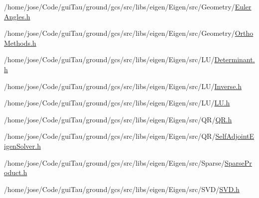 \begin{DoxyCompactItemize}
/home/jose/\-Code/gui\-Tau/ground/gcs/src/libs/eigen/\-Eigen/src/\-Geometry/\hyperlink{_euler_angles_8h}{Euler\-Angles.\-h}\item 
/home/jose/\-Code/gui\-Tau/ground/gcs/src/libs/eigen/\-Eigen/src/\-Geometry/\hyperlink{_ortho_methods_8h}{Ortho\-Methods.\-h}\item 
/home/jose/\-Code/gui\-Tau/ground/gcs/src/libs/eigen/\-Eigen/src/\-L\-U/\hyperlink{_determinant_8h}{Determinant.\-h}\item 
/home/jose/\-Code/gui\-Tau/ground/gcs/src/libs/eigen/\-Eigen/src/\-L\-U/\hyperlink{_inverse_8h}{Inverse.\-h}\item 
/home/jose/\-Code/gui\-Tau/ground/gcs/src/libs/eigen/\-Eigen/src/\-L\-U/\hyperlink{_l_u_8h}{L\-U.\-h}\item 
/home/jose/\-Code/gui\-Tau/ground/gcs/src/libs/eigen/\-Eigen/src/\-Q\-R/\hyperlink{_q_r_8h}{Q\-R.\-h}\item 
/home/jose/\-Code/gui\-Tau/ground/gcs/src/libs/eigen/\-Eigen/src/\-Q\-R/\hyperlink{_self_adjoint_eigen_solver_8h}{Self\-Adjoint\-Eigen\-Solver.\-h}\item 
/home/jose/\-Code/gui\-Tau/ground/gcs/src/libs/eigen/\-Eigen/src/\-Sparse/\hyperlink{_sparse_product_8h}{Sparse\-Product.\-h}\item 
/home/jose/\-Code/gui\-Tau/ground/gcs/src/libs/eigen/\-Eigen/src/\-S\-V\-D/\hyperlink{_s_v_d_8h}{S\-V\-D.\-h}\end{DoxyCompactItemize}
